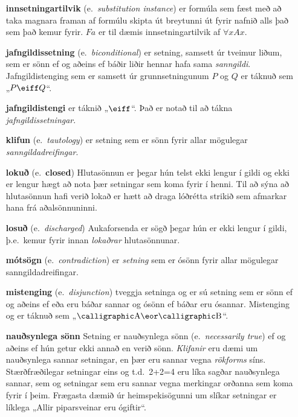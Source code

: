 \begin{enumerate}[leftmargin=35pt]
	\item[\textbf{innsetningartilvik}] (e.\ \emph{substitution instance}) er formúla sem fæst með að taka magnara framan af formúlu skipta út breytunni  út fyrir nafnið  alls það sem það kemur fyrir. $Fa$ er til dæmis innsetningartilvik af $\forall x Ax$.
	
	\item[\textbf{jafngildissetning}] (e.\ \emph{biconditional}) er setning, samsett úr tveimur liðum, sem er sönn ef og aðeins ef báðir liðir hennar hafa sama \emph{sanngildi}. Jafngildistenging sem er samsett úr grunnsetningunum $P$ og $Q$ er táknuð sem „$P \eiff Q$“.
	
	\item[\textbf{jafngildistengi}] er táknið „$\eiff$“. Það er notað til að tákna \emph{jafngildissetningar}.
	
	\item[\textbf{klifun}] (e.\ \emph{tautology}) er setning sem er sönn fyrir allar mögulegar \emph{sanngildadreifingar}.
	
	\item[\textbf{lokuð}] (e.\ \textbf{closed}) Hlutasönnun er  þegar hún telst ekki lengur í gildi og ekki er lengur hægt að nota þær setningar sem koma fyrir í henni. Til að sýna að hlutasönnun hafi verið lokað er hætt að draga lóðrétta strikið sem afmarkar hana frá aðalsönnuninni.
	
	\item[\textbf{losuð}] (e.\ \emph{discharged}) Aukaforsenda er sögð  þegar hún er ekki lengur í gildi, þ.e.\ kemur fyrir innan \emph{lokaðrar} hlutasönnunar.
		
	\item[\textbf{mótsögn}]	(e.\ \emph{contradiction}) er \emph{setning} sem er ósönn fyrir allar mögulegar sanngildadreifingar.
		
	\item[\textbf{mistenging}] (e.\ \emph{disjunction}) tveggja setninga  og  er sú setning sem er sönn ef og aðeins ef  eða  eru báðar sannar og ósönn ef báðar eru ósannar. Mistenging  og  er táknuð sem „$\meta{A} \eor \meta{B}$“.
	
	\item[\textbf{nauðsynlega sönn}] Setning er nauðsynlega sönn (e.\ \emph{necessarily true}) ef og aðeins ef hún getur ekki annað en verið sönn. \emph{Klifanir} eru dæmi um nauðsynlega sannar setningar, en þær eru sannar vegna \emph{rökforms} síns. Stærðfræðilegar setningar eins og t.d.\ 2+2=4 eru líka sagðar nauðsynlega sannar, sem og setningar sem eru sannar vegna merkingar orðanna sem koma fyrir í þeim. Frægasta dæmið úr heimspekisögunni um slíkar setningar er líklega „Allir piparsveinar eru ógiftir“.
	

\end{enumerate}
